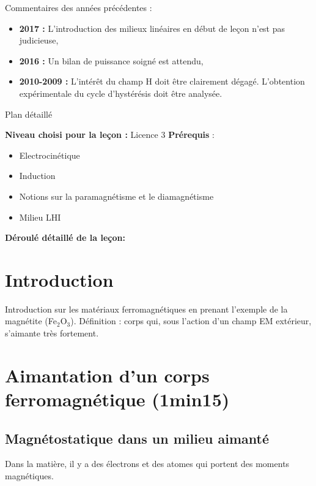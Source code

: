 \begin{reportBlock}{Commentaires des années précédentes :}
    \begin{itemize}
        \item \textbf{2017 :} L’introduction des milieux linéaires en début de leçon n’est pas judicieuse,
        \item \textbf{2016 :} Un bilan de puissance soigné est attendu,
        \item \textbf{2010-2009 : }L’intérêt du champ H doit être clairement dégagé. L’obtention expérimentale du cycle d’hystérésis doit être analysée.
    \end{itemize}
\end{reportBlock}
\begin{reportBlock}{Plan détaillé}

  \textbf{Niveau choisi pour la leçon :} Licence 3
  \newline
  \textbf{Prérequis} : \begin{itemize}
      \item Electrocinétique
      \item Induction
      \item Notions sur la paramagnétisme et le diamagnétisme
      \item Milieu LHI
  \end{itemize}

  \textbf{Déroulé détaillé de la leçon: }  
  
  \section*{Introduction}

Introduction sur les matériaux ferromagnétiques en prenant l'exemple de la magnétite (Fe$_2$O$_3$).
Définition : corps qui, sous l'action d'un champ EM extérieur, s'aimante très fortement.

\section{Aimantation d'un corps ferromagnétique (1min15)}

\subsection{Magnétostatique dans un milieu aimanté}

Dans la matière, il y a des électrons et des atomes qui portent des moments magnétiques. 


\end{reportBlock}
